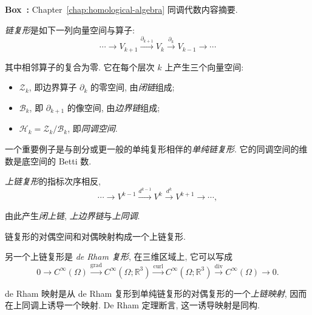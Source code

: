 \begin{MBSourceBox}
\label{box:homological-algebra-summary}
\noindent\textbf{Box~\thebooksummary:} {Chapter~\ref{chap:homological-algebra} 同调代数内容摘要.}\par

\emph{链复形}是如下一列向量空间与算子:
\[
\cdots\to V_{k+1}\xrightarrow{\partial_{k+1}}V_k\xrightarrow{\partial_k}V_{k-1}\to\cdots
\]

其中相邻算子的复合为零. 它在每个层次 $k$ 上产生三个向量空间:
\begin{itemize}
\item {$\mathcal Z_k$, 即边界算子 $\partial_k$ 的零空间, 由\emph{闭链}组成;}
\item {$\mathcal B_k$, 即 $\partial_{k+1}$ 的像空间, 由\emph{边界链}组成;}
\item {$\mathcal H_k=\mathcal Z_k/\mathcal B_k$, 即\emph{同调空间}.}
\end{itemize}

一个重要例子是与剖分或更一般的单纯复形相伴的\emph{单纯链复形}. 它的同调空间的维数是底空间的 Betti 数.

\emph{上链复形}的指标次序相反,
\[
\cdots\to V^{k-1}\xrightarrow{d^{k-1}}V^k\xrightarrow{d^k}V^{k+1}\to\cdots,
\]

由此产生\emph{闭上链}, \emph{上边界链}与\emph{上同调}.

链复形的对偶空间和对偶映射构成一个上链复形.

另一个上链复形是 \emph{de Rham 复形}, 在三维区域上, 它可以写成
\[
0\to C^\infty(\Omega)\xrightarrow{\operatorname{grad}}C^\infty(\Omega;\mathbb R^3)\xrightarrow{\operatorname{curl}}C^\infty(\Omega;\mathbb R^3)\xrightarrow{\operatorname{div}}C^\infty(\Omega)\to0.
\]

de Rham 映射是从 de Rham 复形到单纯链复形的对偶复形的一个\emph{上链映射}, 因而在上同调上诱导一个映射. De Rham 定理断言, 这一诱导映射是同构.
\end{MBSourceBox}
